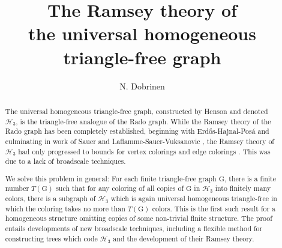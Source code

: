 \documentclass{amsart}
\title[Ramsey theory of the   universal homogeneous triangle-free graph]{The Ramsey theory of\\   the   universal homogeneous triangle-free graph}
\author{N. Dobrinen}
\theoremstyle{remark}
\theoremstyle{definition}
\theoremstyle{remark}
\newcommand{\sse}{\subseteq}
\newcommand{\G}{\mathrm{G}}
\newcommand{\ssim}{\stackrel{s}{\sim}}
\newcommand{\Erdos}{Erd{\H{o}}s}
\newenvironment{nd}{\noindent\color{red}Note: }{}
\begin{document}
\maketitle


\begin{abstract}
The  universal homogeneous triangle-free graph, constructed by Henson \cite{Henson71} and  denoted $\mathcal{H}_3$,
is the triangle-free analogue of the Rado graph.
While the Ramsey theory of the Rado graph has been completely established,
beginning with \Erdos-Hajnal-Pos\'{a} \cite{Erdos/Hajnal/Posa75} and culminating in work of
  Sauer \cite{Sauer06} and Laflamme-Sauer-Vuksanovic  \cite{Laflamme/Sauer/Vuksanovic06},
 the Ramsey theory of $\mathcal{H}_3$ had only progressed to bounds for vertex colorings \cite{Komjath/Rodl86}
 and edge colorings \cite{Sauer98}.
 This was due to  a lack of broadscale techniques.


We solve this problem in general:
 For each finite triangle-free graph $\G$, there is a finite number $T(\G)$ such that for
 any coloring of all copies of $\G$ in $\mathcal{H}_3$ into finitely many colors,
there is a subgraph  of $\mathcal{H}_3$ which is again universal homogeneous triangle-free
 in which the coloring takes  no more than $T(\G)$  colors.
This is the first such result  for a homogeneous structure omitting copies of some non-trivial finite structure.
The proof entails developments of new broadscale techniques,
including
 a  flexible  method for
constructing    trees which code $\mathcal{H}_3$
and the development of their Ramsey theory.
\end{abstract}












\end{document}
